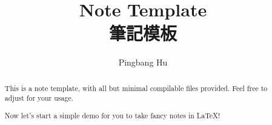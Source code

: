 \documentclass[a4paper]{report}
\author{Pingbang Hu}
\title{Note Template \\ 筆記模板}
\begin{document}
\maketitle

\begin{abstract}
	This is a note template, with all but minimal compilable files provided. Feel free to adjust for your usage.

	Now let's start a simple demo for you to take fancy notes in \LaTeX!
\end{abstract}

\newpage

\tableofcontents


\newpage
\appendix
\appendixpage{}



\newpage
\pagestyle{plain}
\printbibliography{}
\end{document}
